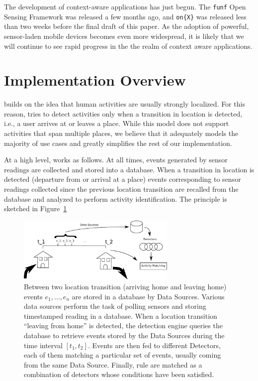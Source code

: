 \documentclass{acm_proc_article-sp}
\begin{document}
The development of context-aware applications has just begun. The {\tt funf} Open Sensing Framework was released a few months ago, and {\tt on\{X\}} was released less than two weeks before the final draft of this paper. As the adoption of powerful, sensor-laden mobile devices becomes even more widespread, it is likely that we will continue to see rapid progress in the the realm of context aware applications.



\section{Implementation Overview}

\LS builds on the idea that human activities are usually strongly localized. For this reason, \LS tries to detect activities only when a transition in location is detected, i.e., a user arrives at or leaves a place. While this model does not support activities that span multiple places, we believe that it adequately models the majority of use cases and greatly simplifies the rest of our implementation. 

At a high level, \LS works as follows. At all times, events generated by sensor readings are collected and stored into a database. When a transition in location is detected (departure from or arrival at a place) events corresponding to sensor readings collected since the previous location transition are recalled from the database and analyzed to perform activity identification. The principle is sketched in Figure~\ref{figure:principle}

\begin{figure}
\begin{center}
\includegraphics[width=3in]{logic}
\caption{
Between two location transition (arriving home and leaving home) events $e_1, \dots, e_n$ are stored in a database by Data Sources. Various data sources perform the task of polling sensors and storing timestamped reading in a database. When a location transition ``leaving from home'' is detected, the detection engine queries the database to retrieve events stored by the Data Sources during the time interval $[t_1, t_2]$. Events are then fed to different Detectors, each of them matching a particular set of events, usually coming from the same Data Source. Finally, rule are matched as a combination of detectors whose conditions have been satisfied.
}
\label{figure:principle}
\end{center}
\end{figure}
\end{document}
